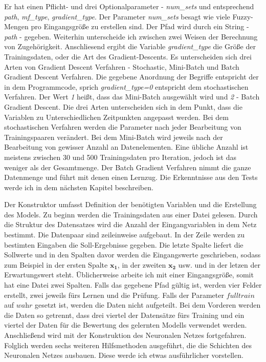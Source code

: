Er hat einen Pflicht- und drei Optionalparameter - \emph{num\_sets} und entsprechend \emph{path}, \emph{mf\_type}, \emph{gradient\_type}. Der Parameter \emph{num\_sets} besagt wie viele Fuzzy-Mengen pro Eingangsgröße zu erstellen sind. Der Pfad wird durch ein String - \emph{path} - gegeben. Weiterhin unterscheide ich zwischen zwei Weisen der Berechnung von Zugehörigkeit. Anschliesend ergibt die Variable \emph{gradient\_type} die Größe der Trainingsdaten, oder die Art des Gradient-Descents. Es unterscheiden sich drei Arten von Gradient Descent Verfahren -
Stochastic, Mini-Batch und Batch Gradient Descent Verfahren. Die gegebene Anordnung der Begriffe entspricht der in dem Programmcode, sprich \emph{gradient\_type=0} entspricht dem stochastischen Verfahren. Der Wert \emph{1} heißt, dass das Mini-Batch ausgewählt wird und \emph{2} - Batch Gradient Descent. Die drei Arten unterscheiden sich in dem Punkt, dass die Variablen zu Unterschiedlichen Zeitpunkten angepasst werden. Bei dem stochastischen Verfahren werden die Parameter nach jeder Bearbeitung von Trainingspaaren verändert. Bei dem Mini-Batch wird jeweils nach der Bearbeitung von gewisser Anzahl an Datenelementen. Eine übliche Anzahl ist meistens zwischen 30 und 500 Trainingsdaten pro Iteration, jedoch ist das weniger als der Gesamtmenge. Der Batch Gradient Verfahren nimmt die ganze Datenmenge und führt mit denen einen Lernzug. Die Erkenntnisse aus den Tests werde ich in dem nächsten Kapitel beschreiben.

Der Konstruktor umfasst Definition der benötigten Variablen und die Erstellung des Models. Zu beginn werden die Trainingsdaten aus einer Datei gelesen. Durch die Struktur des Datensatzes wird die Anzahl der Eingangvariablen in dem Netz bestimmt. Die Datenpaar sind zeileinweise aufgebaut. In der Zeile werden zu bestimten Eingaben die Soll-Ergebnisse gegeben. Die letzte Spalte liefert die Sollwerte und in den Spalten davor werden die Eingangswerte geschrieben, sodass zum Beispiel in der ersten Spalte \(\mathbf{x_1}\), in der zweiten \(\mathbf{x_2}\) usw. und in der letzen der Erwartungswert steht. Üblicherweise arbeite ich mit einer Eingangsgröße, somit hat eine Datei zwei Spalten. 
Falls das gegebene Pfad gültig ist, werden vier Felder erstellt, zwei jeweils fürs Lernen und die Prüfung. Falls der Parameter \(\textit{fulltrain}\) auf \(\textit{wahr}\) gesetzt ist, werden die Daten nicht aufgeteilt. Bei dem Vorderen werden die Daten so getrennt, dass drei viertel der Datensätze fürs Training und ein viertel der Daten für die Bewertung des gelernten Modells verwendet werden. 
Anschließend wird mit der Konstruktion des Neuronalen Netzes fortgefahren. Folglich werden sechs weiteren Hilfsmethoden ausgeführt, die die Schichten des Neuronalen Netzes ausbauen. Diese werde ich etwas ausführlicher vorstellen.

